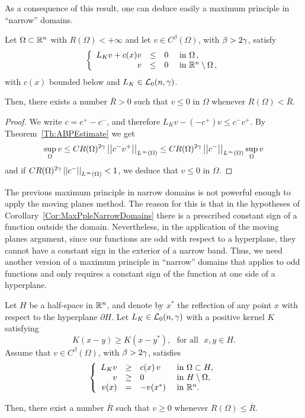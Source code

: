 As a consequence of this result, one can deduce easily a maximum principle in ``narrow'' domains.

\begin{corollary}
	\label{Cor:MaxPpleNarrowDomains}
	Let $\Omega \subset \mathbb{R}^n$ with $R(\Omega) < +\infty$ and let $v\in C^{\beta}(\Omega)$, with $\beta > 2\gamma$, satisfy
	$$
	\left\{\begin{array}{rcll}
	L_K v + c(x)v &\leq & 0 & \text{ in } \Omega\,, \\
	v & \leq & 0 & \text{ in } \mathbb{R}^n\setminus \Omega\,,
	\end{array} \right.
	$$
	with $c(x)$ bounded below and $L_K \in \mathcal{L}_0(n,\gamma)$.
	
	Then, there exists a number $\bar{R} > 0$ such that $v \leq 0$ in $\Omega$ whenever $R(\Omega)< \bar{R}$.
	
\end{corollary}

\begin{proof}
	We write $c= c^+ - c^-$, and therefore $L_K v -(-c^+)v \leq c^- v^+	$. By Theorem~\ref{Th:ABPEstimate} we get
	$$
	\sup_\Omega v \leq C R(\Omega)^{2\gamma} \left | \left |{c^- v^+} \right | \right |_{L^\infty(\Omega)} \leq C R(\Omega)^{2\gamma} \left | \left |{c^-} \right | \right |_{L^\infty(\Omega)} \sup_\Omega v
	$$
	and if $C R(\Omega)^{2\gamma} \left | \left |{c^-} \right | \right |_{L^\infty(\Omega)}  <1 $, we deduce that $v\leq 0$ in $\Omega$.
\end{proof}


The previous maximum principle in narrow domains is not powerful enough to apply the moving planes method. The reason for this is that in the hypotheses of Corollary~\ref{Cor:MaxPpleNarrowDomains} there is a prescribed constant sign of a function outside the domain. Nevertheless, in the application of the moving planes argument, since our functions are odd with respect to a hyperplane, they cannot have a constant sign in the exterior of a narrow band. Thus, we need another version of a maximum principle in ``narrow'' domains that applies to odd functions and only requires a constant sign of the function at one side of a hyperplane.

\begin{proposition}
	\label{Prop:MaxPrpNarrowOdd}
	Let $H$ be a half-space in $\mathbb{R}^n$, and denote by $x^*$ the reflection of any point $x$ with respect to the hyperplane $\partial H$. Let $L_K \in \mathcal{L}_0(n,\gamma)$ with a positive kernel $K$ satisfying
	\begin{equation}
	\label{Eq:KernelSymmetry}
	K(x-y) \geq K(x-y^*), \,\,\,\,\text{for all } \,\, x,y\in H.
	\end{equation}
	Assume that $v\in C^{\beta}(\Omega)$, with $\beta > 2\gamma$, satisfies
	\begin{equation*}
	\left\{\begin{array}{rcll}
	L_K  v &\geq& c(x)\,v  &\textrm{ in } \Omega\subset H,\\
	v &\geq& 0 &\textrm{ in } H\setminus\Omega,\\
	v(x) &=& -v(x^*) &\textrm{ in } \mathbb{R}^n.
	\end{array} \right.
	\end{equation*}
	
	Then, there exist a number $\overline{R}$ such that $v \geq 0$ whenever $R(\Omega) \leq \overline{R}$.
\end{proposition}

